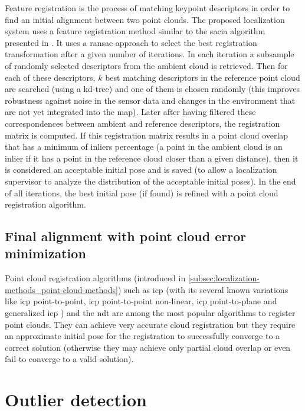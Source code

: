 Feature registration is the process of matching keypoint descriptors in order to find an initial alignment between two point clouds. The proposed localization system uses a feature registration method similar to the \gls{sacia} algorithm presented in \cite{Rusu2009}. It uses a \gls{ransac} approach to select the best registration transformation after a given number of iterations. In each iteration a subsample of randomly selected descriptors from the ambient cloud is retrieved. Then for each of these descriptors, $k$ best matching descriptors in the reference point cloud are searched (using a kd-tree) and one of them is chosen randomly (this improves robustness against noise in the sensor data and changes in the environment that are not yet integrated into the map). Later after having filtered these correspondences between ambient and reference descriptors, the registration matrix is computed. If this registration matrix results in a point cloud overlap that has a minimum of inliers percentage (a point in the ambient cloud is an inlier if it has a point in the reference cloud closer than a given distance), then it is considered an acceptable initial pose and is saved (to allow a localization supervisor to analyze the distribution of the acceptable initial poses). In the end of all iterations, the best initial pose (if found) is refined with a point cloud registration algorithm.


\subsection{Final alignment with point cloud error minimization}

Point cloud registration algorithms (introduced in \cref{subsec:localization-methods_point-cloud-methods}) such as \gls{icp} \cite{Besl1992} (with its several known variations \cite{Rusinkiewicz2001,Pomerleau2013} like \gls{icp} point-to-point, \gls{icp} point-to-point non-linear, \gls{icp} point-to-plane and generalized \gls{icp} \cite{Segal2009}) and the \gls{ndt} \cite{Magnusson2009} are among the most popular algorithms to register point clouds. They can achieve very accurate cloud registration but they require an approximate initial pose for the registration to successfully converge to a correct solution (otherwise they may achieve only partial cloud overlap or even fail to converge to a valid solution).



\section{Outlier detection}

